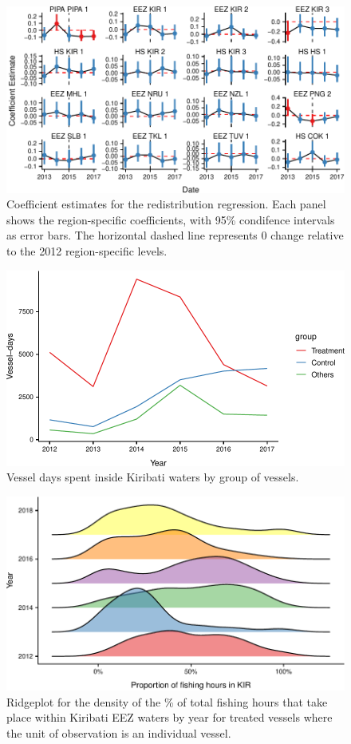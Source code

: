 \documentclass[9p,twocolumn,twoside,lineno]{pnas-new}
\begin{document}
\begin{figure}
\centering
\includegraphics{img/mean_change.pdf}
\caption{\label{fig:mean_change}Coefficient
estimates for the redistribution regression. Each panel shows the
region-specific coefficients, with 95\% condifence intervals
as error bars. The horizontal dashed line represents 0 change
relative to the 2012 region-specific levels.}
\end{figure}

\begin{figure}
\centering
	\includegraphics{img/PS_VDS_KIR_by_year.pdf}
	\caption{\label{fig:PS_VDS_KIR_by_year}Vessel days spent inside Kiribati waters by group of vessels.}
\end{figure}

\begin{figure}
\centering
	\includegraphics{img/hist_kir_fishing.pdf}
	\caption{\label{fig:hist_kir_fishing}Ridgeplot for the density of the \% of total fishing hours that take place within Kiribati EEZ waters by year for treated vessels where the unit of observation is an individual vessel.}
\end{figure}
\end{document}
